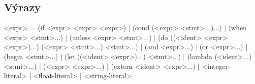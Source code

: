 \subsection{Výrazy}

\begin{gram}
<expr>        = (if <expr> <expr> <expr>)
              | (cond (<expr> <stmt>...)...)
              | (when <expr> <stmt>...)
              | (unless <expr> <stmt>...)
              | (do ((<ident> <expr> <expr>)...) (<expr> <stmt>...) <stmt>...)
              | (and <expr>...)
              | (or <expr>...)
              | (begin <stmt>...)
              | (let ((<ident> <expr>)...) <stmt>...)
              | (lambda (<ident>...) <stmt>...)
              | (<expr> <expr>...)
              | (extern <ident> <expr>...)
              | <integer-literal>
              | <float-literal>
              | <string-literal>
\end{gram}

